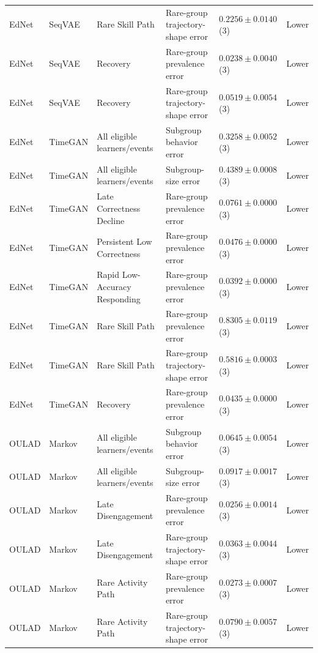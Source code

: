 \begin{longtable}{@{}p{2.25cm}p{2.05cm}p{4.7cm}p{5.0cm}p{2.6cm}p{1.25cm}@{}}
EdNet & SeqVAE & Rare Skill Path & Rare-group trajectory-shape error & $0.2256 \mathbin{\pm} 0.0140$ (3) & Lower \\
EdNet & SeqVAE & Recovery & Rare-group prevalence error & $0.0238 \mathbin{\pm} 0.0040$ (3) & Lower \\
EdNet & SeqVAE & Recovery & Rare-group trajectory-shape error & $0.0519 \mathbin{\pm} 0.0054$ (3) & Lower \\
EdNet & TimeGAN & All eligible learners/events & Subgroup behavior error & $0.3258 \mathbin{\pm} 0.0052$ (3) & Lower \\
EdNet & TimeGAN & All eligible learners/events & Subgroup-size error & $0.4389 \mathbin{\pm} 0.0008$ (3) & Lower \\
EdNet & TimeGAN & Late Correctness Decline & Rare-group prevalence error & $0.0761 \mathbin{\pm} 0.0000$ (3) & Lower \\
EdNet & TimeGAN & Persistent Low Correctness & Rare-group prevalence error & $0.0476 \mathbin{\pm} 0.0000$ (3) & Lower \\
EdNet & TimeGAN & Rapid Low-Accuracy Responding & Rare-group prevalence error & $0.0392 \mathbin{\pm} 0.0000$ (3) & Lower \\
EdNet & TimeGAN & Rare Skill Path & Rare-group prevalence error & $0.8305 \mathbin{\pm} 0.0119$ (3) & Lower \\
EdNet & TimeGAN & Rare Skill Path & Rare-group trajectory-shape error & $0.5816 \mathbin{\pm} 0.0003$ (3) & Lower \\
EdNet & TimeGAN & Recovery & Rare-group prevalence error & $0.0435 \mathbin{\pm} 0.0000$ (3) & Lower \\
OULAD & Markov & All eligible learners/events & Subgroup behavior error & $0.0645 \mathbin{\pm} 0.0054$ (3) & Lower \\
OULAD & Markov & All eligible learners/events & Subgroup-size error & $0.0917 \mathbin{\pm} 0.0017$ (3) & Lower \\
OULAD & Markov & Late Disengagement & Rare-group prevalence error & $0.0256 \mathbin{\pm} 0.0014$ (3) & Lower \\
OULAD & Markov & Late Disengagement & Rare-group trajectory-shape error & $0.0363 \mathbin{\pm} 0.0044$ (3) & Lower \\
OULAD & Markov & Rare Activity Path & Rare-group prevalence error & $0.0273 \mathbin{\pm} 0.0007$ (3) & Lower \\
OULAD & Markov & Rare Activity Path & Rare-group trajectory-shape error & $0.0790 \mathbin{\pm} 0.0057$ (3) & Lower \\

\end{longtable}
